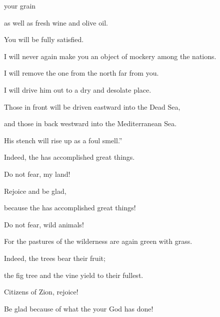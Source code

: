 {your grain
\par }{\Q as well as fresh wine
and olive oil.
\par }{\Q You will be fully satisfied.
\par }{\Q I will never
again
make
you an object of mockery
among the nations.
\par }{\Q {}I will remove
the one from the north
far
from
you.
\par }{\Q I will drive
him out
to
a dry
and desolate
place.
\par }{\Q Those in front
will be driven eastward
into
the Dead Sea,
\par }{\Q and those in back
westward into
the Mediterranean
Sea.
\par }{\Q His stench
will rise up
as a foul smell.”
\par }{\Q Indeed,
the
{} has accomplished
great things.
\par }{\Q {}Do not
fear,
my land!
\par }{\Q Rejoice
and be glad,
\par }{\Q because
the {}
has accomplished
great things!
\par }{\Q {}Do not
fear,
wild
animals!

\par }{\Q For
the pastures
of the wilderness
are again green with grass.
\par }{\Q Indeed,
the trees
bear
their fruit;
\par }{\Q the fig tree
and the vine
yield
to their fullest.
\par }{\Q {}Citizens
of Zion,
rejoice!
\par }{\Q Be glad
because of what the
{}
your God
has done!

}
